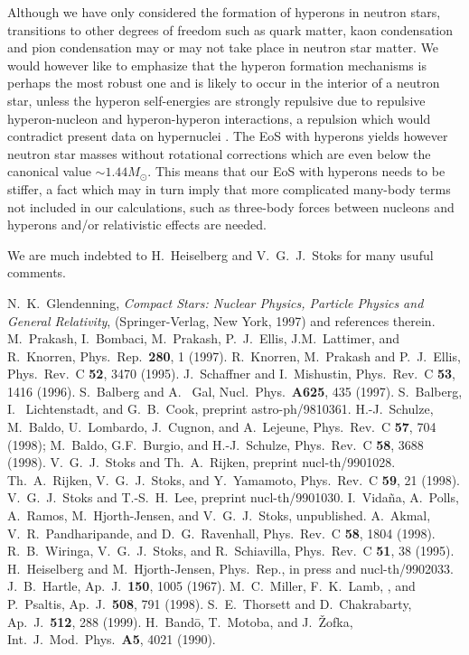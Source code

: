 \begin{multicols}{2}
Although we have only considered the formation of hyperons in neutron
stars, transitions to other degrees of freedom such as quark matter,
kaon condensation and pion condensation may or may not take place 
in neutron star matter.
We would however like to emphasize that the hyperon formation mechanisms
is perhaps the most robust one and is likely to occur in the interior 
of a neutron star, unless the hyperon self-energies are strongly repulsive due
to repulsive hyperon-nucleon and hyperon-hyperon interactions, a repulsion 
which  would contradict
present data on hypernuclei \cite{bando}. 
The EoS with hyperons yields however neutron star masses without 
rotational corrections which are even below the canonical value $\sim 1.44M_\odot$.
This means that our EoS with hyperons needs to be stiffer, a fact which may in turn
imply that more complicated many-body terms not included in our calculations,
such as three-body forces between nucleons and hyperons and/or relativistic
effects  are needed.

We are much indebted to H.~Heiselberg and V.~G.~J.~Stoks for many usuful comments.

\begin{thebibliography}{200}


   N.~K.\ Glendenning, {\em Compact Stars: 
Nuclear Physics, Particle Physics and General Relativity}, 
(Springer-Verlag, New York, 1997) and references therein.
 M.\ Prakash, I.\ Bombaci, M.\ Prakash, 
                    P.~J.\ Ellis, J.M.\ Lattimer, and R.\ Knorren, 
                    Phys.\ Rep.\ {\bf 280}, 1 (1997). 
 R.\ Knorren, M.\ Prakash and P.~J.\ Ellis,
Phys.\ Rev.\ C {\bf 52}, 3470 (1995).
 J.\ Schaffner and I.\ Mishustin, Phys.\ Rev.\
C {\bf 53}, 1416 (1996). 
 S.~Balberg and A.~ Gal, Nucl.\ Phys.\ {\bf A625}, 435 (1997).
\bibitem{blc99} S.~Balberg, I.~ Lichtenstadt, and G.~B.~Cook, preprint astro-ph/9810361.
\bibitem{bbs98} H.-J.\ Schulze, M.\ Baldo, U.\ Lombardo,
J.\ Cugnon, and A.\ Lejeune, Phys.\ Rev.\ C {\bf 57}, 704 (1998);
M.\ Baldo, G.F.\ Burgio, and H.-J.\ Schulze, Phys.\ Rev.\ C {\bf 58}, 3688 (1998).
\bibitem{sr99} V.~G.~J.\ Stoks and Th.~A.\ Rijken, preprint nucl-th/9901028.
\bibitem{rsy98} Th.~A.\ Rijken, V.~G.~J.\ Stoks, and Y.\ Yamamoto, Phys.\ Rev.\ C {\bf 59},
                21 (1998). 
 V.~G.~J.\ Stoks and T.-S.~H.\ Lee, preprint nucl-th/9901030.
\bibitem{isaac99} I.~Vida\~na, A.\ Polls, A.\ Ramos, M.\ Hjorth-Jensen, 
                  and V.~G.~J.\ Stoks, unpublished.
 A.\ Akmal, V.~R.\ Pandharipande, and D.~G.\ Ravenhall,
Phys.\ Rev.\ C {\bf 58}, 1804 (1998).
 R.\ B.\ Wiringa, V.~G.~J.\ Stoks, and R.\ Schiavilla, Phys.\ Rev.\ C {\bf 51}, 
38 (1995). 
 H.\ Heiselberg and M.\ Hjorth-Jensen, Phys.\ Rep., in press 
and nucl-th/9902033.
 J.~B.\ Hartle, Ap.\ J.\  {\bf 150}, 1005 (1967).
\bibitem{Lamb}  M.~C.\ Miller, F.~K.\ Lamb, , and P.\  Psaltis,  Ap.\ J.\ {\bf 508}, 791 (1998).
\bibitem{thorsett} S.~E.\ Thorsett and D.\ Chakrabarty, Ap.\ J.\ {\bf 512}, 288 (1999).
\bibitem{bando} H.\ Band\={o}, T.\ Motoba, and J.\ \v{Z}ofka, Int.\ J.\ Mod.\
Phys.\ {\bf A5}, 4021 (1990).


\end{thebibliography}
\end{multicols}
